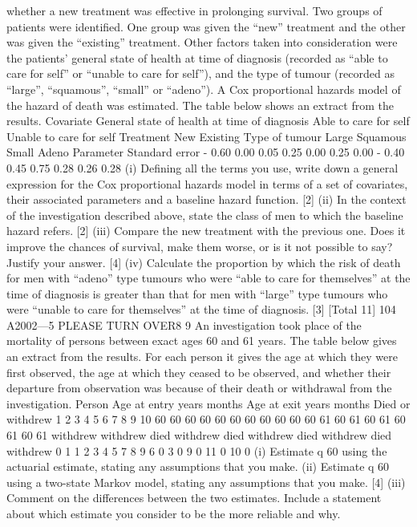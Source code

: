 \documentclass[a4paper,12pt]{article}
\begin{document}
whether a new treatment was effective in prolonging survival. Two groups of patients
were identified. One group was given the “new” treatment and the other was given
the “existing” treatment. Other factors taken into consideration were the patients’
general state of health at time of diagnosis (recorded as “able to care for self” or
“unable to care for self”), and the type of tumour (recorded as “large”, “squamous”,
“small” or “adeno”).
A Cox proportional hazards model of the hazard of death was estimated. The table
below shows an extract from the results.
Covariate
General state of health at time of diagnosis
Able to care for self
Unable to care for self
Treatment
New
Existing
Type of tumour
Large
Squamous
Small
Adeno
Parameter Standard error
- 0.60
0.00 0.05
0.25
0.00 0.25
0.00
- 0.40
0.45
0.75
0.28
0.26
0.28
(i) Defining all the terms you use, write down a general expression for the Cox
proportional hazards model in terms of a set of covariates, their associated
parameters and a baseline hazard function.
[2]
(ii) In the context of the investigation described above, state the class of men to
which the baseline hazard refers.
[2]
(iii) Compare the new treatment with the previous one. Does it improve the
chances of survival, make them worse, or is it not possible to say? Justify
your answer.
[4]
(iv) Calculate the proportion by which the risk of death for men with “adeno” type
tumours who were “able to care for themselves” at the time of diagnosis is
greater than that for men with “large” type tumours who were “unable to care
for themselves” at the time of diagnosis.
[3]
[Total 11]
104 A2002—5
PLEASE TURN OVER8
9
An investigation took place of the mortality of persons between exact ages 60 and 61
years. The table below gives an extract from the results. For each person it gives the
age at which they were first observed, the age at which they ceased to be observed,
and whether their departure from observation was because of their death or
withdrawal from the investigation.
Person Age at entry
years months Age at exit
years months Died or withdrew
1
2
3
4
5
6
7
8
9
10 60
60
60
60
60
60
60
60
60
60 60
61
60
61
60
61
60
61
60
61 withdrew
withdrew
died
withdrew
died
withdrew
died
withdrew
died
withdrew
0
1
1
2
3
4
5
7
8
9
6
0
3
0
9
0
11
0
10
0
(i) Estimate q 60 using the actuarial estimate, stating any assumptions that you
make.
(ii) Estimate q 60 using a two-state Markov model, stating any assumptions that
you make.
[4]
(iii) Comment on the differences between the two estimates. Include a statement
about which estimate you consider to be the more reliable and why.
\end{document}
